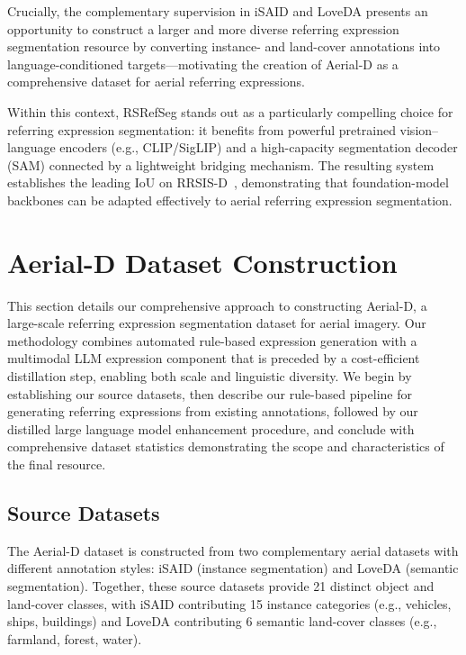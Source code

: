 \documentclass[journal]{IEEEtran}
\begin{document}
Crucially, the complementary supervision in iSAID and LoveDA presents an opportunity to construct a larger and more diverse referring expression segmentation resource by converting instance- and land-cover annotations into language-conditioned targets—motivating the creation of Aerial-D as a comprehensive dataset for aerial referring expressions.

Within this context, RSRefSeg stands out as a particularly compelling choice for referring expression segmentation: it benefits from powerful pretrained vision--language encoders (e.g., CLIP/SigLIP) and a high-capacity segmentation decoder (SAM) connected by a lightweight bridging mechanism. The resulting system establishes the leading IoU on RRSIS-D~\cite{chen2025rsrefseg}, demonstrating that foundation-model backbones can be adapted effectively to aerial referring expression segmentation.

\section{Aerial-D Dataset Construction}
\label{sec:approach}

This section details our comprehensive approach to constructing Aerial-D, a large-scale referring expression segmentation dataset for aerial imagery. Our methodology combines automated rule-based expression generation with a multimodal LLM expression component that is preceded by a cost-efficient distillation step, enabling both scale and linguistic diversity. We begin by establishing our source datasets, then describe our rule-based pipeline for generating referring expressions from existing annotations, followed by our distilled large language model enhancement procedure, and conclude with comprehensive dataset statistics demonstrating the scope and characteristics of the final resource.

\subsection{Source Datasets}

The Aerial-D dataset is constructed from two complementary aerial datasets with different annotation styles: iSAID (instance segmentation) and LoveDA (semantic segmentation). Together, these source datasets provide 21 distinct object and land-cover classes, with iSAID contributing 15 instance categories (e.g., vehicles, ships, buildings) and LoveDA contributing 6 semantic land-cover classes (e.g., farmland, forest, water).
\end{document}
